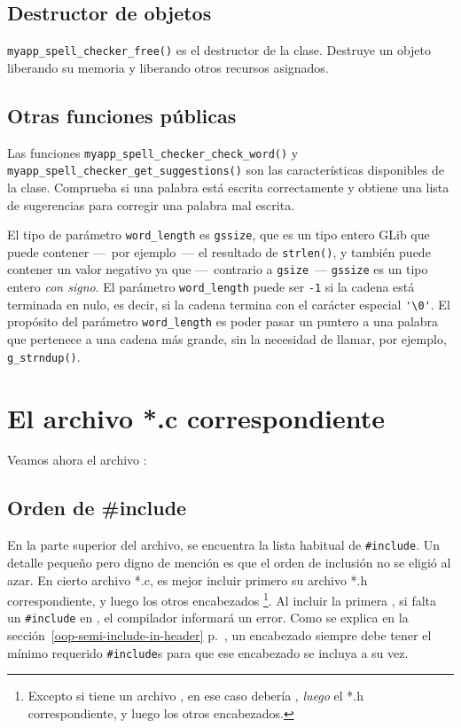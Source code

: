 \subsection{Destructor de objetos}
\lstinline{myapp_spell_checker_free()} es el destructor de la clase. Destruye un objeto liberando su memoria y liberando otros recursos asignados.

\subsection{Otras funciones públicas}
Las funciones \lstinline{myapp_spell_checker_check_word()} y \lstinline{myapp_spell_checker_get_suggestions()} son las características disponibles de la clase. Comprueba si una palabra está escrita correctamente y obtiene una lista de sugerencias para corregir una palabra mal escrita.

El tipo de parámetro \lstinline{word_length} es \lstinline{gssize}, que es un tipo entero GLib que puede contener ---~por ejemplo~--- el resultado de \lstinline{strlen()}, y también puede contener un valor negativo ya que ---~contrario a \lstinline{gsize}~--- \lstinline {gssize} es un tipo entero \emph{con signo}. El parámetro \lstinline{word_length} puede ser \lstinline{-1} si la cadena está terminada en nulo, es decir, si la cadena termina con el carácter especial \lstinline{'\0'}. El propósito del parámetro \lstinline{word_length} es poder pasar un puntero a una palabra que pertenece a una cadena más grande, sin la necesidad de llamar, por ejemplo, \lstinline{g_strndup()}.

\section{El archivo *.c correspondiente}

Veamos ahora el archivo :

\vspace{0.7cm}


\subsection{Orden de \#include}
En la parte superior del archivo, se encuentra la lista habitual de \lstinline{#include}. Un detalle pequeño pero digno de mención es que el orden de inclusión no se eligió al azar. En cierto archivo *.c, es mejor incluir primero su archivo *.h correspondiente, y luego los otros encabezados \footnote{Excepto si tiene un archivo , en ese caso debería , \emph{luego} el *.h correspondiente, y luego los otros encabezados.}. Al incluir la primera , si falta un \lstinline{#include} en , el compilador informará un error. Como se explica en la sección~\ref{oop-semi-include-in-header} p.~\pageref{oop-semi-include-in-header}, un encabezado siempre debe tener el mínimo requerido \lstinline{#include}s para que ese encabezado se incluya a su vez.


